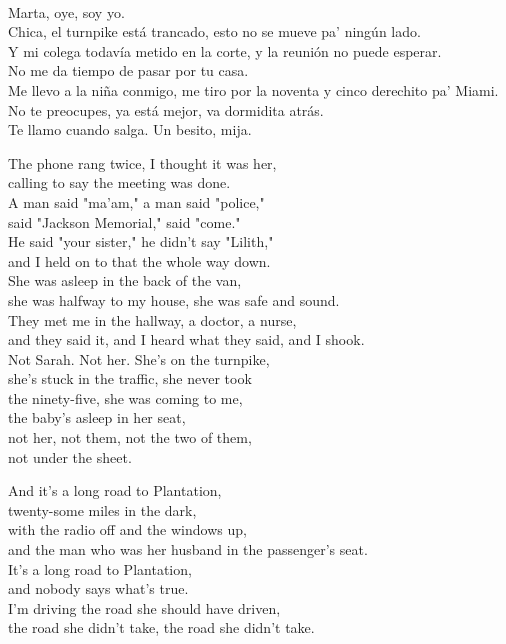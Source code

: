 \begin{lyrics}
\\
Marta, oye, soy yo.\\
Chica, el turnpike está trancado, esto no se mueve pa' ningún lado.\\
Y mi colega todavía metido en la corte, y la reunión no puede esperar.\\
No me da tiempo de pasar por tu casa.\\
Me llevo a la niña conmigo, me tiro por la noventa y cinco derechito pa' Miami.\\
No te preocupes, ya está mejor, va dormidita atrás.\\
Te llamo cuando salga. Un besito, mija.

The phone rang twice, I thought it was her,\\
calling to say the meeting was done.\\
A man said "ma'am," a man said "police,"\\
said "Jackson Memorial," said "come."\\
He said "your sister," he didn't say "Lilith,"\\
and I held on to that the whole way down.\\
She was asleep in the back of the van,\\
she was halfway to my house, she was safe and sound.\\
They met me in the hallway, a doctor, a nurse,\\
and they said it, and I heard what they said, and I shook.\\
Not Sarah. Not her. She's on the turnpike,\\
she's stuck in the traffic, she never took\\
the ninety-five, she was coming to me,\\
the baby's asleep in her seat,\\
not her, not them, not the two of them,\\
not under the sheet.

And it's a long road to Plantation,\\
twenty-some miles in the dark,\\
with the radio off and the windows up,\\
and the man who was her husband in the passenger's seat.\\
It's a long road to Plantation,\\
and nobody says what's true.\\
I'm driving the road she should have driven,\\
the road she didn't take, the road she didn't take.


\end{lyrics}

